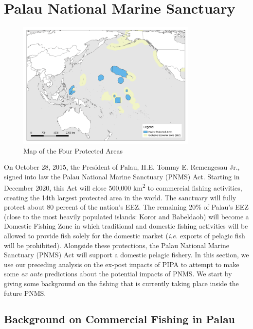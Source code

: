 \documentclass[9p,twocolumn,twoside,lineno]{pnas-new}
\begin{document}
\section{Palau National Marine Sanctuary}\label{PNMS}

\begin{figure}[h]
	\includegraphics[width=0.8\textwidth]{img/Color_V1.png}
	\caption{Map of the Four Protected Areas}
	\label{fig:maps}
\end{figure}

On October 28, 2015, the President of Palau, H.E. Tommy E. Remengesau Jr., signed into law the Palau National Marine Sanctuary (PNMS) Act. Starting in December 2020, this Act will close 500,000 km\textsuperscript{2} to commercial fishing activities, creating the 14th largest protected area in the world. The sanctuary will fully protect about 80 percent of the nation’s EEZ. The remaining 20\% of Palau’s EEZ (close to the most heavily populated islands: Koror and Babeldaob) will become a Domestic Fishing Zone in which traditional and domestic fishing activities will be allowed to provide fish solely for the domestic market (\emph{i.e.} exports of pelagic fish will be prohibited). Alongside these protections, the Palau National Marine Sanctuary (PNMS) Act will support a domestic pelagic fishery. In this section, we use our preceding analysis on the ex-post impacts of PIPA to attempt to make some \emph{ex ante} predictions about the potential impacts of PNMS. We start by giving some background on the fishing that is currently taking place inside the future PNMS. 

\subsection{Background on Commercial Fishing in Palau}\label{Palau_back}
\end{document}
